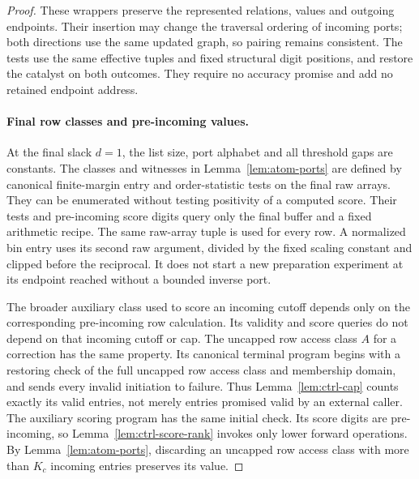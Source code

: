 \begin{proof}
These wrappers preserve the represented relations, values and outgoing
endpoints. Their insertion may change the traversal ordering of incoming
ports; both directions use the same updated graph, so pairing remains
consistent. The tests use the same effective tuples and fixed structural
digit positions, and restore the catalyst on both outcomes. They require no
accuracy promise and add no retained endpoint address.

\paragraph{Final row classes and pre-incoming values.}
At the final slack $d=1$, the list size, port alphabet and all threshold
gaps are constants.  The classes and witnesses in
Lemma~\ref{lem:atom-ports} are defined by canonical finite-margin entry
and order-statistic tests on the final raw arrays.  They can be enumerated without
testing positivity of a computed score.  Their tests and pre-incoming
score digits query only the final buffer and a fixed arithmetic recipe.
The same raw-array tuple is used for every row.  A normalized bin
entry uses its second raw argument, divided by the fixed scaling
constant and clipped before the reciprocal.  It does not start a new
preparation experiment at its endpoint reached without a bounded inverse port.

The broader auxiliary class used to score an incoming cutoff depends
only on the corresponding pre-incoming row calculation.  Its validity
and score queries do not depend on that incoming cutoff or cap.  The
uncapped row access class $A$ for a correction has the same property.  Its canonical
terminal program begins with a restoring check of the full uncapped row access
class and membership domain, and sends every invalid initiation to
failure.  Thus Lemma~\ref{lem:ctrl-cap} counts exactly its valid entries,
not merely entries promised valid by an external caller.  The auxiliary
scoring program has the same initial check.  Its score digits are
pre-incoming, so Lemma~\ref{lem:ctrl-score-rank} invokes only lower
forward operations.  By Lemma~\ref{lem:atom-ports}, discarding an
uncapped row access class with more than $K_c$ incoming entries preserves its value.


\end{proof}
